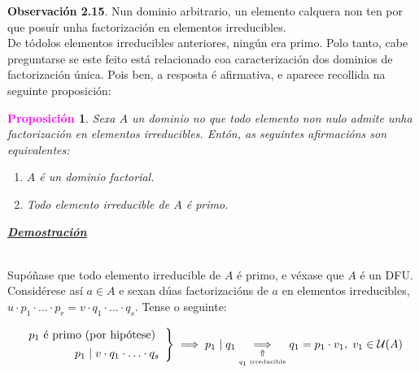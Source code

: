 \documentclass[twoside]{report}
\newcommand{\magbf}[1]{\textcolor{magenta}{\textbf{#1}}} %
\theoremstyle{mystyle}
\newtheorem{prop}{\magbf{Proposición}}[chapter]
\newenvironment{proposition}
{\begin{mdframed}[linecolor = magenta,backgroundcolor = classicrose, linewidth = 2mm]\begin{prop}}
{\end{prop}\end{mdframed}}
\begin{document}
\noindent \textbf{Observación 2.15}. Nun dominio arbitrario, un elemento calquera non ten por que posuír unha factorización en elementos irreducibles.\\

\noindent De tódolos elementos irreducibles anteriores, ningún era primo. Polo tanto, cabe preguntarse se este feito está relacionado coa caracterización dos dominios de factorización única. Pois ben, a resposta é afirmativa, e aparece recollida na seguinte proposición:\\

\begin{proposition} \label{prop2.13}
Sexa $A$ un dominio no que todo elemento non nulo admite unha factorización en elementos irreducibles. Entón, as seguintes afirmacións son equivalentes:
\begin{enumerate}
    \item $A$ é un dominio factorial.
    \item Todo elemento irreducible de $A$ é primo.
\end{enumerate}
\end{proposition}

\vspace{2mm}

\noindent \textbf{\textit{\underline{Demostración}}}

\vspace{2mm}

\noindent {}\\

\noindent Supóñase que todo elemento irreducible de $A$ é primo, e véxase que $A$ é un DFU.\\

\noindent Considérese así $a \in A$ e sexan dúas factorizacións de $a$ en elementos irreducibles, $u \cdot p_{1} \cdot \ldots \cdot p_{r} = v \cdot q_{1} \cdot \ldots \cdot  q_{s}$. Tense o seguinte:

    \[ 
    \left. \begin{array}{r} 
    p_{1} \text{ é primo (por hipótese) } \\[1ex]
    p_{1} \hspace{1mm} | \hspace{1mm} v \cdot q_{1} \cdot \ldots \cdot q_{s}
    \end{array} \right\}
    \implies p_{1} \hspace{1mm} | \hspace{1mm} q_{1} \underset{\underset{q_{1} \text{ irreducible}}{\Uparrow}}{\implies} q_{1} = p_{1} \cdot v_{1}, \hspace{1mm} v_{1} \in \mathcal{U}(A)
    \]
    
\end{document}
